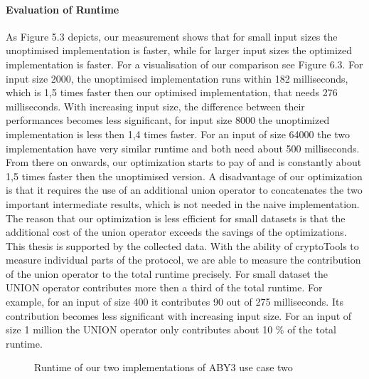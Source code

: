 \paragraph{Evaluation of Runtime}
As Figure 5.3 depicts, our measurement shows that for small input sizes the unoptimised implementation is faster, while for larger input sizes the optimized implementation is faster. For a visualisation of our comparison see Figure 6.3. For input size 2000, the unoptimised implementation runs within 182 milliseconds, which is 1,5 times faster then our optimised implementation, that needs 276 milliseconds. With increasing input size, the difference between their performances becomes less significant, for input size 8000 the unoptimized implementation is less then 1,4 times faster. For an input of size 64000 the two implementation have very similar runtime and both need about 500 milliseconds. From there on onwards, our optimization starts to pay of and is constantly about 1,5 times faster then the unoptimised version.  
A disadvantage of our optimization is that it requires the use of an additional union operator to concatenates the two important intermediate results, which is not needed in the naive implementation. The reason that our optimization is less efficient for small datasets is that the additional cost of the union operator exceeds the savings of the optimizations. This thesis is supported by the collected data. With the ability of cryptoTools to measure individual parts of the protocol, we are able to measure the contribution of the union operator to the total runtime precisely. For small dataset the UNION operator contributes more then a third of the total runtime. For example, for an input of size 400 it contributes 90 out of 275 milliseconds. Its contribution becomes less significant with increasing input size. For an input of size 1 million the UNION operator only contributes about 10 \% of the total runtime. 

\begin{figure}[H]
\caption{Runtime of our two implementations of ABY3  use case two}
\end{figure}
